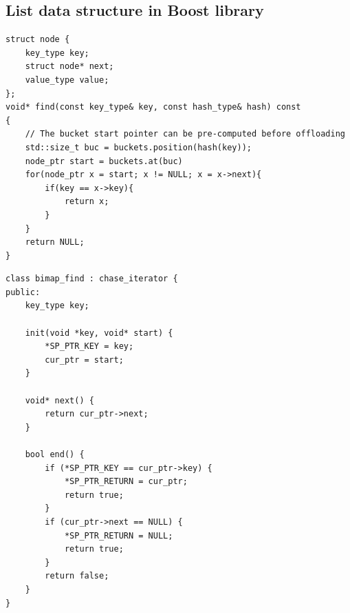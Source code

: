 \begin{minipage}{0.47\textwidth}
\subsection{List data structure in Boost library}
\centering
\begin{lstlisting}[caption={Boost realization for \code{bimap::find()}},label={lst:bimap}, captionpos=t]
struct node {
    key_type key;
    struct node* next;
    value_type value;
};
void* find(const key_type& key, const hash_type& hash) const
{
    // The bucket start pointer can be pre-computed before offloading
    std::size_t buc = buckets.position(hash(key));
    node_ptr start = buckets.at(buc)
    for(node_ptr x = start; x != NULL; x = x->next){
        if(key == x->key){
            return x;
        }
    }
    return NULL;
}
\end{lstlisting}

\begin{lstlisting}[caption={\name realization for \code{bimap::find()}},label={lst:bimap_mod}, captionpos=t]
class bimap_find : chase_iterator {
public:
    key_type key;
  
    init(void *key, void* start) {
        *SP_PTR_KEY = key;
        cur_ptr = start;
    }
  
    void* next() {
        return cur_ptr->next;
    }
  
    bool end() {
        if (*SP_PTR_KEY == cur_ptr->key) {
            *SP_PTR_RETURN = cur_ptr;
            return true;
        }
        if (cur_ptr->next == NULL) {
            *SP_PTR_RETURN = NULL;  
            return true;
        }
        return false;
    }
}
\end{lstlisting}
\end{minipage}

